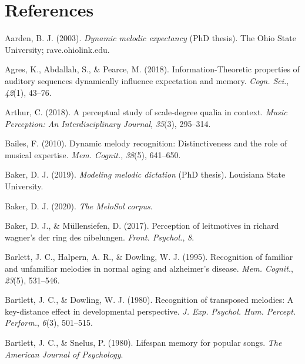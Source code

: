 \documentclass[english,man,floatsintext]{apa6}
\begin{document}
\newpage

\hypertarget{references}{%
\section{References}\label{references}}

\begingroup
\setlength{\parindent}{-0.5in}
\setlength{\leftskip}{0.5in}

\hypertarget{refs}{}
\leavevmode\hypertarget{ref-Aarden2003-ib}{}%
Aarden, B. J. (2003). \emph{Dynamic melodic expectancy} (PhD thesis). The Ohio State University; rave.ohiolink.edu.

\leavevmode\hypertarget{ref-Agres2018-dw}{}%
Agres, K., Abdallah, S., \& Pearce, M. (2018). Information-Theoretic properties of auditory sequences dynamically influence expectation and memory. \emph{Cogn. Sci.}, \emph{42}(1), 43--76.

\leavevmode\hypertarget{ref-Arthur2018-my}{}%
Arthur, C. (2018). A perceptual study of scale-degree qualia in context. \emph{Music Perception: An Interdisciplinary Journal}, \emph{35}(3), 295--314.

\leavevmode\hypertarget{ref-Bailes2010-nh}{}%
Bailes, F. (2010). Dynamic melody recognition: Distinctiveness and the role of musical expertise. \emph{Mem. Cognit.}, \emph{38}(5), 641--650.

\leavevmode\hypertarget{ref-Baker2019-ij}{}%
Baker, D. J. (2019). \emph{Modeling melodic dictation} (PhD thesis). Louisiana State University.

\leavevmode\hypertarget{ref-Baker2020-pw}{}%
Baker, D. J. (2020). \emph{The MeloSol corpus}.

\leavevmode\hypertarget{ref-Baker2017-nt}{}%
Baker, D. J., \& Müllensiefen, D. (2017). Perception of leitmotives in richard wagner's der ring des nibelungen. \emph{Front. Psychol.}, \emph{8}.

\leavevmode\hypertarget{ref-Barlett1995-iw}{}%
Barlett, J. C., Halpern, A. R., \& Dowling, W. J. (1995). Recognition of familiar and unfamiliar melodies in normal aging and alzheimer's disease. \emph{Mem. Cognit.}, \emph{23}(5), 531--546.

\leavevmode\hypertarget{ref-Bartlett1980-yv}{}%
Bartlett, J. C., \& Dowling, W. J. (1980). Recognition of transposed melodies: A key-distance effect in developmental perspective. \emph{J. Exp. Psychol. Hum. Percept. Perform.}, \emph{6}(3), 501--515.

\leavevmode\hypertarget{ref-Bartlett1980-fc}{}%
Bartlett, J. C., \& Snelus, P. (1980). Lifespan memory for popular songs. \emph{The American Journal of Psychology}.
\end{document}
